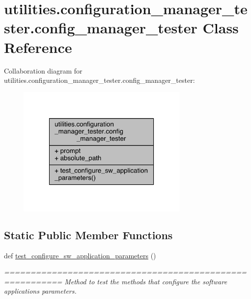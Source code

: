 \hypertarget{classutilities_1_1configuration__manager__tester_1_1config__manager__tester}{}\section{utilities.\+configuration\+\_\+manager\+\_\+tester.\+config\+\_\+manager\+\_\+tester Class Reference}
\label{classutilities_1_1configuration__manager__tester_1_1config__manager__tester}


Collaboration diagram for utilities.\+configuration\+\_\+manager\+\_\+tester.\+config\+\_\+manager\+\_\+tester\+:
\nopagebreak
\begin{figure}[H]
\begin{center}
\leavevmode
\includegraphics[width=238pt]{d4/dab/classutilities_1_1configuration__manager__tester_1_1config__manager__tester__coll__graph}
\end{center}
\end{figure}
\subsection*{Static Public Member Functions}
\begin{DoxyCompactItemize}
\item 
def \hyperlink{classutilities_1_1configuration__manager__tester_1_1config__manager__tester_a1f30cbc427332b33d4e4a8e32ae3b980}{test\+\_\+configure\+\_\+sw\+\_\+application\+\_\+parameters} ()
\begin{DoxyCompactList}\small\item\em ========================================================= Method to test the methods that configure the software application\textquotesingle{}s parameters. \end{DoxyCompactList}\end{DoxyCompactItemize}
